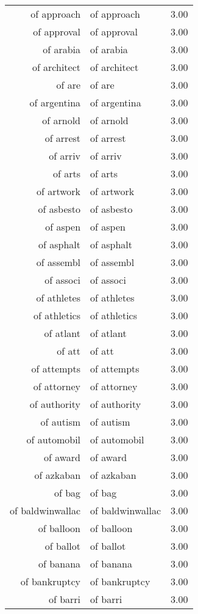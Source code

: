 \begin{table}[ht]
\begin{tabular}{rlr}
  of approach & of approach & 3.00 \\ 
  of approval & of approval & 3.00 \\ 
  of arabia & of arabia & 3.00 \\ 
  of architect & of architect & 3.00 \\ 
  of are & of are & 3.00 \\ 
  of argentina & of argentina & 3.00 \\ 
  of arnold & of arnold & 3.00 \\ 
  of arrest & of arrest & 3.00 \\ 
  of arriv & of arriv & 3.00 \\ 
  of arts & of arts & 3.00 \\ 
  of artwork & of artwork & 3.00 \\ 
  of asbesto & of asbesto & 3.00 \\ 
  of aspen & of aspen & 3.00 \\ 
  of asphalt & of asphalt & 3.00 \\ 
  of assembl & of assembl & 3.00 \\ 
  of associ & of associ & 3.00 \\ 
  of athletes & of athletes & 3.00 \\ 
  of athletics & of athletics & 3.00 \\ 
  of atlant & of atlant & 3.00 \\ 
  of att & of att & 3.00 \\ 
  of attempts & of attempts & 3.00 \\ 
  of attorney & of attorney & 3.00 \\ 
  of authority & of authority & 3.00 \\ 
  of autism & of autism & 3.00 \\ 
  of automobil & of automobil & 3.00 \\ 
  of award & of award & 3.00 \\ 
  of azkaban & of azkaban & 3.00 \\ 
  of bag & of bag & 3.00 \\ 
  of baldwinwallac & of baldwinwallac & 3.00 \\ 
  of balloon & of balloon & 3.00 \\ 
  of ballot & of ballot & 3.00 \\ 
  of banana & of banana & 3.00 \\ 
  of bankruptcy & of bankruptcy & 3.00 \\ 
  of barri & of barri & 3.00 \\ 

\end{tabular}
\end{table}
